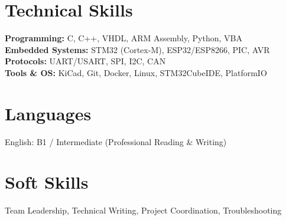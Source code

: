 \documentclass[10.5pt,a4paper]{article}
\begin{document}
\section*{Technical Skills}

\textbf{Programming:} C, C++, VHDL, ARM Assembly, Python, VBA\\
\textbf{Embedded Systems:} STM32 (Cortex-M), ESP32/ESP8266, PIC, AVR\\
\textbf{Protocols:} UART/USART, SPI, I2C, CAN\\
\textbf{Tools \& OS:} KiCad, Git, Docker, Linux, STM32CubeIDE, PlatformIO

\section*{Languages}
English: B1 / Intermediate (Professional Reading \& Writing)

\section*{Soft Skills}
Team Leadership, Technical Writing, Project Coordination, Troubleshooting
\end{document}
